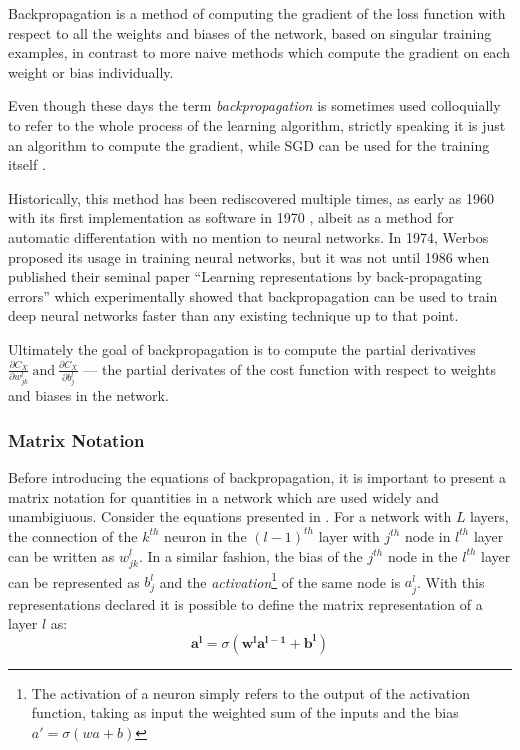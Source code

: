 Backpropagation is a method of computing the gradient of the loss function
with respect to all the weights and biases of the network, based on singular
training examples, in contrast to more naive methods which compute the gradient
on each weight or bias individually.

Even though these days the term \textit{backpropagation} is sometimes
used colloquially to refer to the whole process of the learning algorithm,
strictly speaking it is just an algorithm to compute the gradient, while SGD can be
used for the training itself \cite{book:Goodfellow}.

Historically, this method has been rediscovered multiple times, as early
as 1960 \cite{article:SCHMID} with its first implementation as
software in 1970 \cite[p.~229]{book:Goodfellow}, albeit as a method
for automatic differentation with no mention to neural networks. In
1974, Werbos proposed its usage in training neural
networks\cite{book:WerbosBackprop}, but it was not until 1986 when
\citet*{article:backprop} published their seminal paper ``Learning
representations by back-propagating errors'' which experimentally
showed that backpropagation can be used to train deep neural networks
faster than any existing technique up to that point.


Ultimately the goal of backpropagation is to compute the partial
derivatives $\frac{\partial C_X}{\partial w^l_{jk}} ~\text{and}~ \frac{\partial
  C_X}{\partial b^l_{j}}$ --- the partial derivates of the cost function
 with respect to weights and biases in the network.


\subsubsection*{Matrix Notation}

Before introducing the equations of backpropagation, it is
important to present a matrix notation for quantities in a
network which are used widely and unambigiuous. Consider the
equations presented in . For a network
with $L$ layers, the connection of the $k^{th}$ neuron in the
$(l-1)^{th}$ layer with $j^{th}$ node in $l^{th}$ layer can be
written as $w_{jk}^l$. In a similar fashion, the bias of the
$j^{th}$ node in the $l^{th}$ layer can be represented as $b^l_j$
and the \textit{activation}\footnote{The activation of a neuron
  simply refers to the output of the activation function, taking as
  input the weighted sum of the inputs and the bias $a' = \sigma(wa +
  b)$
} of the same node is $a_j^l$. With this representations declared
it is possible to define the matrix representation of a layer $l$ as:
\begin{equation}
  \label{eq:layer}
  \bm{a^l} = \sigma(\bm{w^l} \bm{a^{l-1}} + \bm{b^l})
\end{equation}

